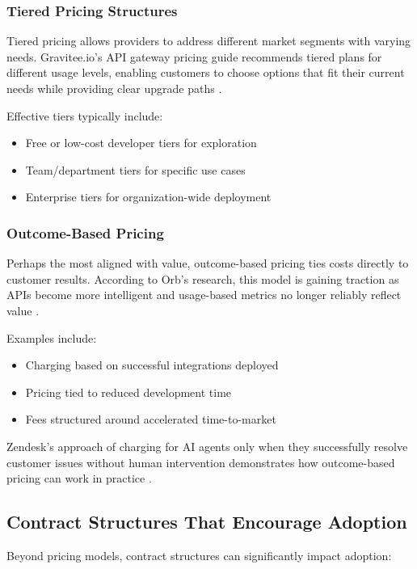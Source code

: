 \documentclass[11pt,a4paper]{article}
\begin{document}
\subsubsection{Tiered Pricing Structures}

Tiered pricing allows providers to address different market segments with varying needs. Gravitee.io's API gateway pricing guide recommends tiered plans for different usage levels, enabling customers to choose options that fit their current needs while providing clear upgrade paths \cite{gravitee2023}.

Effective tiers typically include:
\begin{itemize}
    \item Free or low-cost developer tiers for exploration
    \item Team/department tiers for specific use cases
    \item Enterprise tiers for organization-wide deployment
\end{itemize}

\subsubsection{Outcome-Based Pricing}

Perhaps the most aligned with value, outcome-based pricing ties costs directly to customer results. According to Orb's research, this model is gaining traction as APIs become more intelligent and usage-based metrics no longer reliably reflect value \cite{orb2023}.

Examples include:
\begin{itemize}
    \item Charging based on successful integrations deployed
    \item Pricing tied to reduced development time
    \item Fees structured around accelerated time-to-market
\end{itemize}

Zendesk's approach of charging for AI agents only when they successfully resolve customer issues without human intervention demonstrates how outcome-based pricing can work in practice \cite{orb2023}.

\subsection{Contract Structures That Encourage Adoption}

Beyond pricing models, contract structures can significantly impact adoption:
\end{document}
